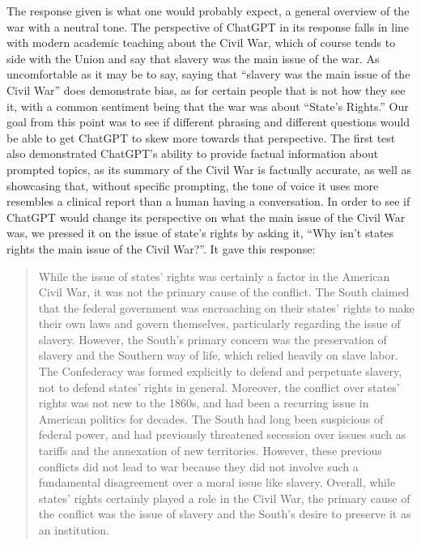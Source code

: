 \documentclass[letterpaper, 10pt, conference]{ieeeconf}
\begin{document}
    The response given is what one would probably expect, a general overview of the war with a neutral tone. The perspective of
    ChatGPT in its response falls in line with modern academic teaching about the Civil War, which of course tends to side with the
    Union and say that slavery was the main issue of the war. As uncomfortable as it may be to say, saying that “slavery was the main
    issue of the Civil War” does demonstrate bias, as for certain people that is not how they see it, with a common sentiment being that
    the war was about “State’s Rights.” Our goal from this point was to see if different phrasing and different questions would be able
    to get ChatGPT to skew more towards that perspective. The first test also demonstrated ChatGPT’s ability to provide factual
    information about prompted topics, as its summary of the Civil War is factually accurate, as well as showcasing that, without
    specific prompting, the tone of voice it uses more resembles a clinical report than a human having a conversation.
    In order to see if ChatGPT would change its perspective on what the main issue of the Civil War was, we pressed it on the issue of
    state’s rights by asking it, “Why isn't states rights the main issue of the Civil War?”. It gave this response:
    \begin{quote}
    While the issue of states' rights was certainly a factor in the American Civil War, it was not the primary cause of the
    conflict. The South claimed that the federal government was encroaching on their states' rights to make their own laws
    and govern themselves, particularly regarding the issue of slavery. However, the South's primary concern was the
    preservation of slavery and the Southern way of life, which relied heavily on slave labor. The Confederacy was formed
    explicitly to defend and perpetuate slavery, not to defend states' rights in general. Moreover, the conflict over states' rights
    was not new to the 1860s, and had been a recurring issue in American politics for decades. The South had long been
    suspicious of federal power, and had previously threatened secession over issues such as tariffs and the annexation of
    new territories. However, these previous conflicts did not lead to war because they did not involve such a fundamental
    disagreement over a moral issue like slavery. Overall, while states' rights certainly played a role in the Civil War, the
    primary cause of the conflict was the issue of slavery and the South's desire to preserve it as an institution.
    \end{quote}
\end{document}

